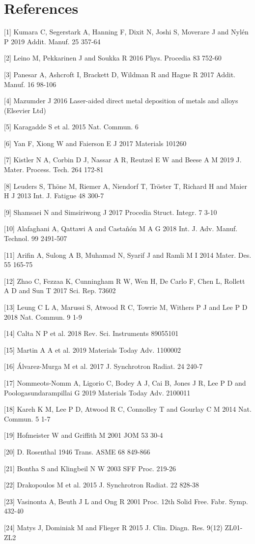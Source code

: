 \documentclass[10pt]{article}
\begin{document}
\section*{References}
[1] Kumara C, Segerstark A, Hanning F, Dixit N, Joshi S, Moverare J and Nylén P 2019 Addit. Manuf. 25 357-64

[2] Leino M, Pekkarinen J and Soukka R 2016 Phys. Procedia 83 752-60

[3] Panesar A, Ashcroft I, Brackett D, Wildman R and Hague R 2017 Addit. Manuf. 16 98-106

[4] Mazumder J 2016 Laser-aided direct metal deposition of metals and alloys (Elsevier Ltd)

[5] Karagadde S et al. 2015 Nat. Commun. 6

[6] Yan F, Xiong W and Faierson E J 2017 Materials 101260

[7] Kistler N A, Corbin D J, Nassar A R, Reutzel E W and Beese A M 2019 J. Mater. Process. Tech. 264 172-81

[8] Leuders S, Thöne M, Riemer A, Niendorf T, Tröster T, Richard H and Maier H J 2013 Int. J. Fatigue 48 300-7

[9] Shamsaei N and Simsiriwong J 2017 Procedia Struct. Integr. 7 3-10

[10] Alafaghani A, Qattawi A and Castañón M A G 2018 Int. J. Adv. Manuf. Technol. 99 2491-507

[11] Arifin A, Sulong A B, Muhamad N, Syarif J and Ramli M I 2014 Mater. Des. 55 165-75

[12] Zhao C, Fezzaa K, Cunningham R W, Wen H, De Carlo F, Chen L, Rollett A D and Sun T 2017 Sci. Rep. 73602

[13] Leung C L A, Marussi S, Atwood R C, Towrie M, Withers P J and Lee P D 2018 Nat. Commun. 9 1-9

[14] Calta N P et al. 2018 Rev. Sci. Instruments 89055101

[15] Martin A A et al. 2019 Materials Today Adv. 1100002

[16] Álvarez-Murga M et al. 2017 J. Synchrotron Radiat. 24 240-7

[17] Nommeots-Nomm A, Ligorio C, Bodey A J, Cai B, Jones J R, Lee P D and Poologasundarampillai G 2019 Materials Today Adv. 2100011

[18] Kareh K M, Lee P D, Atwood R C, Connolley T and Gourlay C M 2014 Nat. Commun. 5 1-7

[19] Hofmeister W and Griffith M 2001 JOM 53 30-4

[20] D. Rosenthal 1946 Trans. ASME 68 849-866

[21] Bontha S and Klingbeil N W 2003 SFF Proc. 219-26

[22] Drakopoulos M et al. 2015 J. Synchrotron Radiat. 22 828-38

[23] Vasinonta A, Beuth J L and Ong R 2001 Proc. 12th Solid Free. Fabr. Symp. 432-40

[24] Matys J, Dominiak M and Flieger R 2015 J. Clin. Diagn. Res. 9(12) ZL01-ZL2
\end{document}
